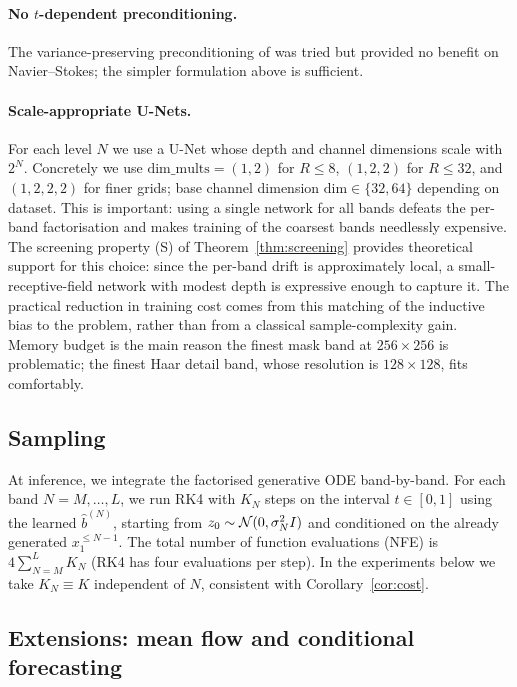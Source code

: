 \documentclass[11pt]{amsart}
\theoremstyle{remark}
\numberwithin{equation}{section}
\begin{document}
\paragraph{No $t$-dependent preconditioning.} The variance-preserving preconditioning of \cite{karras2022elucidating} was tried but provided no benefit on Navier--Stokes; the simpler formulation above is sufficient.

\paragraph{Scale-appropriate U-Nets.} For each level $N$ we use a U-Net whose depth and channel dimensions scale with $2^N$. Concretely we use $\mathrm{dim\_mults}=(1,2)$ for $R\le 8$, $(1,2,2)$ for $R\le 32$, and $(1,2,2,2)$ for finer grids; base channel dimension $\mathrm{dim}\in\{32,64\}$ depending on dataset. This is important: using a single network for all bands defeats the per-band factorisation and makes training of the coarsest bands needlessly expensive. The screening property (S) of Theorem~\ref{thm:screening} provides theoretical support for this choice: since the per-band drift is approximately local, a small-receptive-field network with modest depth is expressive enough to capture it. The practical reduction in training cost comes from this matching of the inductive bias to the problem, rather than from a classical sample-complexity gain. Memory budget is the main reason the finest mask band at $256\times 256$ is problematic; the finest Haar detail band, whose resolution is $128\times 128$, fits comfortably.

\subsection{Sampling}
At inference, we integrate the factorised generative ODE band-by-band. For each band $N=M,\ldots,L$, we run RK4 with $K_N$ steps on the interval $t\in[0,1]$ using the learned $\hat b^{(N)}$, starting from $z_0\sim\mathcal{N}(0,\sigma_N^2 I)$ and conditioned on the already generated $x_1^{\le N-1}$. The total number of function evaluations (NFE) is $4\sum_{N=M}^L K_N$ (RK4 has four evaluations per step). In the experiments below we take $K_N\equiv K$ independent of $N$, consistent with Corollary~\ref{cor:cost}.

\subsection{Extensions: mean flow and conditional forecasting}
\end{document}
